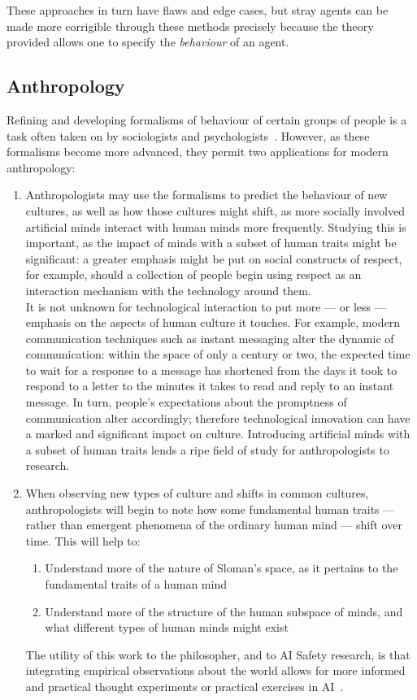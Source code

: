 These approaches in turn have flaws and edge cases, but stray agents can be made more corrigible through these methods precisely because the theory provided allows one to specify the \emph{behaviour} of an agent.

\subsection{Anthropology}
Refining and developing formalisms of behaviour of certain groups of people is a task often taken on by sociologists and psychologists~\citep{Gambetta1988, luhmann2000familiarity}. However, as these formalisms become more advanced, they permit two applications for modern anthropology:

\begin{enumerate}
    \item Anthropologists may use the formalisms to predict the behaviour of new cultures, as well as how those cultures might shift, as more socially involved artificial minds interact with human minds more frequently. Studying this is important, as the impact of minds with a subset of human traits might be significant: a greater emphasis might be put on social constructs of respect, for example, should a collection of people begin using respect as an interaction mechanism with the technology around them. \\
        It is not unknown for technological interaction to put more --- or less --- emphasis on the aspects of human culture it touches. For example, modern communication techniques such as instant messaging alter the dynamic of communication: within the space of only a century or two, the expected time to wait for a response to a message has shortened from the days it took to respond to a letter to the minutes it takes to read and reply to an instant message. In turn, people's expectations about the promptness of communication alter accordingly; therefore technological innovation can have a marked and significant impact on culture. Introducing artificial minds with a subset of human traits lends a ripe field of study for anthropologists to research.
    \item When observing new types of culture and shifts in common cultures, anthropologists will begin to note how some fundamental human traits --- rather than emergent phenomena of the ordinary human mind --- shift over time. This will help to:
        \begin{enumerate}
            \item Understand more of the nature of Sloman's space, as it pertains to the fundamental traits of a human mind
            \item Understand more of the structure of the human subspace of minds, and what different types of human minds might exist
        \end{enumerate}
        The utility of this work to the philosopher, and to AI Safety research, is that integrating empirical observations about the world allows for more informed and practical thought experiments or practical exercises in AI~. 
\end{enumerate}

